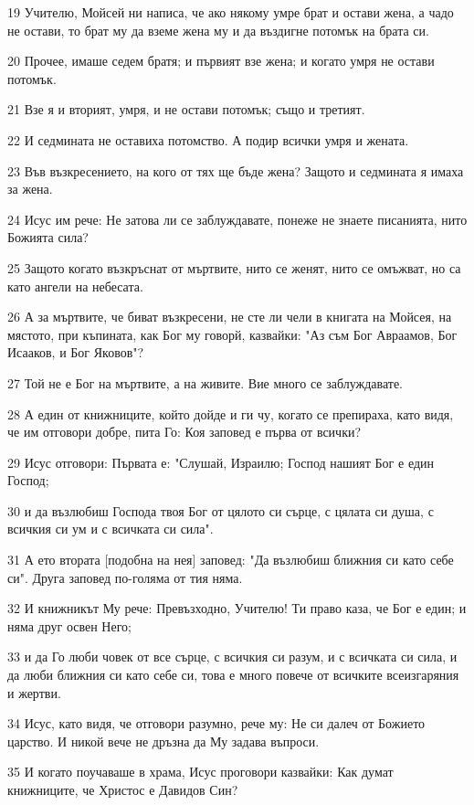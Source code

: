 \par 19 Учителю, Мойсей ни написа, че ако някому умре брат и остави жена, а чадо не остави, то брат му да вземе жена му и да въздигне потомък на брата си.
\par 20 Прочее, имаше седем братя; и първият взе жена; и когато умря не остави потомък.
\par 21 Взе я и вторият, умря, и не остави потомък; също и третият.
\par 22 И седмината не оставиха потомство. А подир всички умря и жената.
\par 23 Във възкресението, на кого от тях ще бъде жена? Защото и седмината я имаха за жена.
\par 24 Исус им рече: Не затова ли се заблуждавате, понеже не знаете писанията, нито Божията сила?
\par 25 Защото когато възкръснат от мъртвите, нито се женят, нито се омъжват, но са като ангели на небесата.
\par 26 А за мъртвите, че биват възкресени, не сте ли чели в книгата на Мойсея, на мястото, при къпината, как Бог му говорй, казвайки: "Аз съм Бог Авраамов, Бог Исааков, и Бог Яковов"?
\par 27 Той не е Бог на мъртвите, а на живите. Вие много се заблуждавате.
\par 28 А един от книжниците, който дойде и ги чу, когато се препираха, като видя, че им отговори добре, пита Го: Коя заповед е първа от всички?
\par 29 Исус отговори: Първата е: "Слушай, Израилю; Господ нашият Бог е един Господ;
\par 30 и да възлюбиш Господа твоя Бог от цялото си сърце, с цялата си душа, с всичкия си ум и с всичката си сила".
\par 31 А ето втората [подобна на нея] заповед: "Да възлюбиш ближния си като себе си". Друга заповед по-голяма от тия няма.
\par 32 И книжникът Му рече: Превъзходно, Учителю! Ти право каза, че Бог е един; и няма друг освен Него;
\par 33 и да Го люби човек от все сърце, с всичкия си разум, и с всичката си сила, и да люби ближния си като себе си, това е много повече от всичките всеизгаряния и жертви.
\par 34 Исус, като видя, че отговори разумно, рече му: Не си далеч от Божието царство. И никой вече не дръзна да Му задава въпроси.
\par 35 И когато поучаваше в храма, Исус проговори казвайки: Как думат книжниците, че Христос е Давидов Син?
